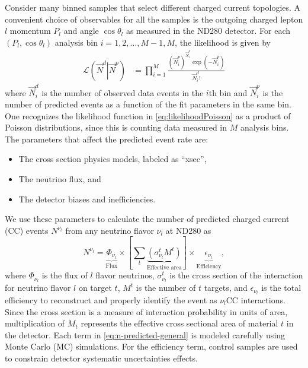 Consider many binned samples that select different charged current
topologies. A convenient choice of observables for all the samples
is the outgoing charged lepton $l$ momentum $P_{l}$ and angle $\cos\theta_{l}$
as measured in the ND280 detector\cite{Hartz2015}. For each $\left(P_{l},\cos\theta_{l}\right)$
analysis bin $i=1,2,\ldots,M-1,M$, the likelihood is given by
\begin{equation}
\begin{aligned}\mathcal{L}\left(\vec{N}^{d}\left|\vec{N}^{p}\right.\right) & =\prod_{i=1}^{M}\frac{\left(\vec{N}_{i}^{p}\right)^{\vec{N}_{i}^{d}}\exp\left(-\vec{N}_{i}^{p}\right)}{\vec{N}_{i}^{d}!}\end{aligned}
\label{eq:likelihoodPoisson}
\end{equation}
where $\vec{N}_{i}^{d}$ is the number of observed data events in
the $i$th bin and $\vec{N}_{i}^{p}$ is the number of predicted events
as a function of the fit parameters in the same bin. One recognizes
the likelihood function in \eqref{eq:likelihoodPoisson} as a product
of Poisson distributions, since this is counting data measured in
$M$ analysis bins. The parameters that affect the predicted event
rate are:
\begin{itemize}
\item The cross section physics models, labeled as ``xsec'',
\item The neutrino flux, and
\item The detector biases and inefficiencies.
\end{itemize}
We use these parameters to calculate the number of predicted charged
current (CC) events $N^{\nu_{l}}$ from any neutrino flavor $\nu_{l}$
at ND280 as
\begin{equation}
N^{\nu_{l}}=\underset{\text{Flux}}{\underbrace{\Phi_{\nu_{l}}}}\times\left[\sum_{t}\underset{\text{Effective area}}{\underbrace{\left(\sigma_{\nu_{l}}^{t}M^{t}\right)}}\right]\times\underset{\text{Efficiency}}{\underbrace{\epsilon_{\nu_{l}}}},\label{eq:n-predicted-general}
\end{equation}
where $\Phi_{\nu_{l}}$ is the flux of $l$ flavor neutrinos, $\sigma_{\nu_{l}}^{t}$
is the cross section of the interaction for neutrino flavor $l$ on
target $t$, $M^{t}$ is the number of $t$ targets, and $\epsilon_{\nu_{l}}$
is the total efficiency to reconstruct and properly identify the event
as $\nu_{l}$CC interactions. Since the cross section is a measure
of interaction probability in units of area, multiplication of $M_{t}$
represents the effective cross sectional area of material $t$ in
the detector. Each term in \eqref{eq:n-predicted-general} is modeled
carefully using Monte Carlo (MC) simulations. For the efficiency term,
control samples are used to constrain detector systematic uncertainties
effects.


